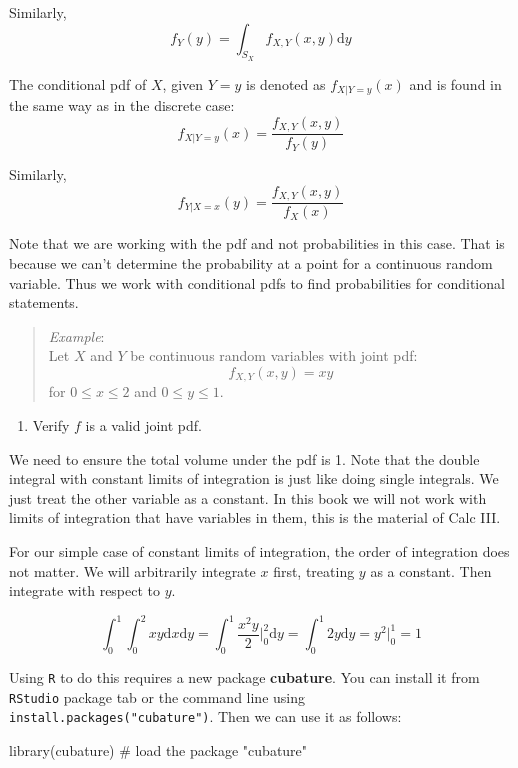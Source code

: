 \documentclass[
  letterpaper,
  DIV=11,
  numbers=noendperiod]{scrreprt}
\newenvironment{Shaded}{\begin{snugshade}}{\end{snugshade}}
\newcommand{\CommentTok}[1]{\textcolor[rgb]{0.37,0.37,0.37}{#1}}
\newcommand{\FunctionTok}[1]{\textcolor[rgb]{0.28,0.35,0.67}{#1}}
\newcommand{\NormalTok}[1]{\textcolor[rgb]{0.00,0.23,0.31}{#1}}
\providecommand{\tightlist}{%
  \setlength{\itemsep}{0pt}\setlength{\parskip}{0pt}}\usepackage{longtable,booktabs,array}
\begin{document}
Similarly, \[
f_Y(y)=\int_{S_X}f_{X,Y}(x,y)\mbox{d}y
\]

The conditional pdf of \(X\), given \(Y=y\) is denoted as
\(f_{X|Y=y}(x)\) and is found in the same way as in the discrete case:
\[
f_{X|Y=y}(x)=\frac{f_{X,Y}(x,y)}{f_Y(y)}
\]

Similarly, \[
f_{Y|X=x}(y)=\frac{f_{X,Y}(x,y)}{f_X(x)}
\]

Note that we are working with the pdf and not probabilities in this
case. That is because we can't determine the probability at a point for
a continuous random variable. Thus we work with conditional pdfs to find
probabilities for conditional statements.

\begin{quote}
\emph{Example}:\\
Let \(X\) and \(Y\) be continuous random variables with joint pdf:\\
\[
f_{X,Y}(x,y)=xy
\] for \(0\leq x \leq 2\) and \(0 \leq y \leq 1\).
\end{quote}

\begin{enumerate}
\def\labelenumi{\alph{enumi})}
\tightlist
\item
  Verify \(f\) is a valid joint pdf.
\end{enumerate}

We need to ensure the total volume under the pdf is 1. Note that the
double integral with constant limits of integration is just like doing
single integrals. We just treat the other variable as a constant. In
this book we will not work with limits of integration that have
variables in them, this is the material of Calc III.

For our simple case of constant limits of integration, the order of
integration does not matter. We will arbitrarily integrate \(x\) first,
treating \(y\) as a constant. Then integrate with respect to \(y\).

\[
\int_0^1 \int_0^2 xy \mbox{d}x \mbox{d}y = \int_0^1 \frac{x^2y}{2}\bigg|_0^2 \mbox{d}y = \int_0^1 2y\mbox{d}y = y^2\bigg|_0^1 = 1
\]

Using \texttt{R} to do this requires a new package \textbf{cubature}.
You can install it from \texttt{RStudio} package tab or the command line
using \texttt{install.packages("cubature")}. Then we can use it as
follows:

\begin{Shaded}
\begin{Highlighting}[]
 \FunctionTok{library}\NormalTok{(cubature) }\CommentTok{\# load the package "cubature"}
\end{Highlighting}
\end{Shaded}
\end{document}
